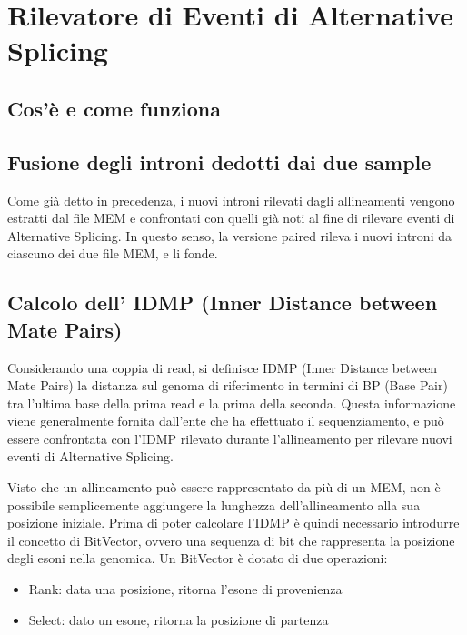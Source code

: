 \section{Rilevatore di Eventi di Alternative Splicing}

\subsection{Cos'è e come funziona}

\newpage

\subsection{Fusione degli introni dedotti dai due sample}

Come già detto in precedenza, i nuovi introni rilevati dagli allineamenti vengono estratti dal file MEM e confrontati con quelli già noti al fine di rilevare eventi di Alternative Splicing. In questo senso, la versione paired rileva i nuovi introni da ciascuno dei due file MEM, e li fonde.


\newpage

\subsection{Calcolo dell' IDMP (Inner Distance between Mate Pairs)}
Considerando una coppia di read, si definisce IDMP (Inner Distance between Mate Pairs) la distanza sul genoma di riferimento in termini di BP (Base Pair) tra l'ultima base della prima read e la prima della seconda. Questa informazione viene generalmente fornita dall'ente che ha effettuato il sequenziamento, e può essere confrontata con l'IDMP rilevato durante l'allineamento per rilevare nuovi eventi di Alternative Splicing.

Visto che un allineamento può essere rappresentato da più di un MEM, non è possibile semplicemente aggiungere la lunghezza dell'allineamento alla sua posizione iniziale. Prima di poter calcolare l'IDMP è quindi necessario introdurre il concetto di BitVector, ovvero una sequenza di bit che rappresenta la posizione degli esoni nella genomica. Un BitVector è dotato di due operazioni:

\begin{itemize}
	\item Rank: data una posizione, ritorna l'esone di provenienza
	\item Select: dato un esone, ritorna la posizione di partenza 
\end{itemize}

